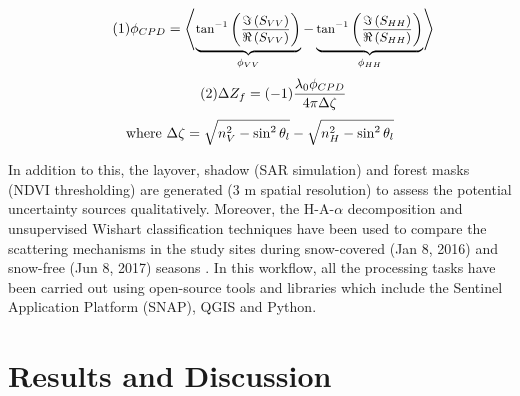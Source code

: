 \documentclass{article}
\begin{document}
\begin{equation}\tag{1}
    \centering
    \small{\phi_{CPD} =\left\langle\underbrace{\tan^{-1}\left(\frac{\Im\left(S_{VV}\right)}{\Re\left(S_{VV}\right)}\right)}_{\phi_{VV}} - \underbrace{\tan^{-1}\left(\frac{\Im\left(S_{HH}\right)}{\Re\left(S_{HH}\right)}\right)}_{\phi_{HH}}\right\rangle}
    \label{1}
\end{equation}
\begin{equation}\tag{2}
    \centering
    \small{\Delta{Z_f} = (-1)\frac{\lambda_0\phi_{CPD}}{4\pi\Delta{\zeta}}}
    \label{2}
\end{equation}
\begin{equation*}
    \centering
    \text{where } \small{\Delta{\zeta} = \sqrt{n^2_V - \sin^{2}\theta_l} - \sqrt{n^2_H - \sin^{2}\theta_l}}
\end{equation*}


In addition to this, the layover, shadow (SAR simulation) and forest masks (NDVI thresholding) are generated (3 m spatial resolution) to assess the potential uncertainty sources qualitatively. Moreover, the H-A-$\alpha$ decomposition and unsupervised Wishart classification techniques have been used to compare the scattering mechanisms in the study sites during snow-covered (Jan 8, 2016) and snow-free (Jun 8, 2017) seasons \cite{Singh2014}. In this workflow, all the processing tasks have been carried out using open-source tools and libraries which include the Sentinel Application Platform (SNAP), QGIS and Python.     

\section{Results and Discussion}
\label{sec:results}
\end{document}
